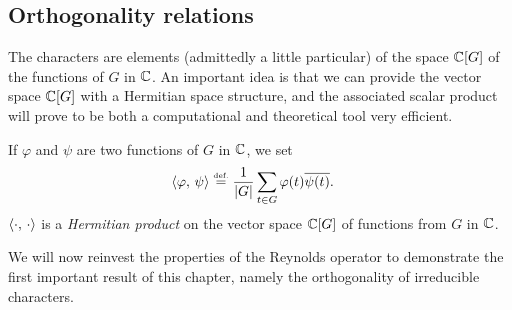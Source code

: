 \subsection{Orthogonality relations}
 
 
The characters are elements (admittedly a little particular) of the space $ \mathbb{C} [G] $ of the functions of $G$ in $ \mathbb{C} $. An important idea is that we can provide the vector space $ \mathbb{C} [G] $ with a Hermitian space structure, and the associated scalar product will prove to be both a computational and theoretical tool very efficient.
 
 
 
 
\begin{defn}
 If $ \varphi $ and $ \psi $ are two functions of $G$ in $ \mathbb{C} $, we set
\begin{align*}
\langle \varphi,\,\psi\rangle & \stackrel{\mbox{\upshape\tiny def.}}{=} \frac{1}{|G|} \sum_{t \in G}{\varphi (t) \overline{\psi (t)}}.
\end{align*}
$ \langle \cdot,\,\cdot\rangle $ is a \textit{Hermitian product} on the vector space $ \mathbb{C} [G] $ of functions from $G$ in $ \mathbb{C} $.
\end{defn}
We will now reinvest the properties of the Reynolds operator to demonstrate the first important result of this chapter, namely the orthogonality of irreducible characters.
 
